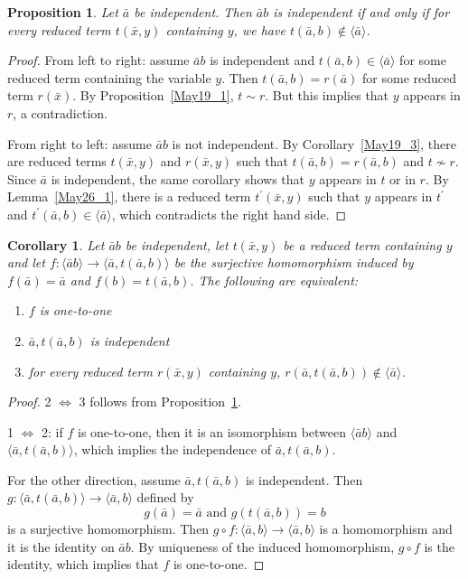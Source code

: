 \documentclass[a4paper, 11pt]{article}
\theoremstyle{note}
\newtheorem{prop}[thm]{Proposition}
\newtheorem{cor}[thm]{Corollary}
\begin{document}
	
	\begin{prop}\label{May26_2} Let $\bar{a}$  be independent. Then  $\bar{a}b$ is independent if and only if  for every reduced term $t(\bar{x},y)$ containing $y$, we have  $t(\bar{a},b)\not\in\langle \bar{a}\rangle$.
	\end{prop}
	\begin{proof} From left to right: assume $\bar{a}b$ is independent and  $t(\bar{a},b)\in\langle \bar{a}\rangle$  for some reduced term containing the variable $y$. Then $t(\bar{a},b)= r(\bar{a})$  for some reduced term $r(\bar{x})$. By Proposition~\ref{May19_1}, $t\sim r$. But this implies that $y$ appears in $r$, a contradiction.
		
		From right to left: assume $\bar{a}b$ is not independent. By Corollary~\ref{May19_3}, there are reduced terms $t(\bar{x},y)$ and $r(\bar{x},y)$ such that  $t(\bar{a},b)=r(\bar{a},b)$  and $t\not\sim r$. Since $\bar{a}$ is independent, the same corollary shows that $y$ appears in $t$ or in $r$. By Lemma~\ref{May26_1}, there is a reduced term $t^\prime(\bar{x},y)$ such that  $y$ appears in $t^\prime$ and   $t^\prime(\bar{a},b)\in\langle\bar{a}\rangle$, which contradicts the right hand side.
	\end{proof}
	
	\begin{cor}\label{May26_3} Let $\bar{a}b$  be independent, let $t(\bar{x},y)$ be a reduced term containing $y$ and let  $f:\langle\bar{a}b\rangle \rightarrow \langle\bar{a},t(\bar{a},b)\rangle$  be the surjective homomorphism induced by  $f(\bar{a})=\bar{a}$  and  $f(b)=t(\bar{a},b)$. The following are equivalent:
		\begin{enumerate}
			\item $f$ is one-to-one
			\item $\bar{a},t(\bar{a},b)$ is independent
			\item for every reduced term $r(\bar{x},y)$ containing $y$,  $r(\bar{a},t(\bar{a},b))\not\in\langle\bar{a}\rangle$.
		\end{enumerate}
	\end{cor}
	\begin{proof} 2 $\Leftrightarrow$ 3 follows from Proposition~\ref{May26_2}.
		
		1 $\Leftrightarrow$ 2:  if $f$ is one-to-one, then it is an isomorphism between $\langle\bar{a}b\rangle $  and $\langle\bar{a},t(\bar{a},b)\rangle$, which implies the independence of  $\bar{a},t(\bar{a},b)$. 
		
		For the other direction, assume  $\bar{a},t(\bar{a},b)$ is independent. Then  $g:\langle \bar{a},t(\bar{a},b)\rangle \rightarrow \langle \bar{a},b\rangle$  defined by  
		\[g(\bar{a})=\bar{a} \mbox{ and }g(t(\bar{a},b))= b \]
		 is a surjective homomorphism. Then  $g\circ f:\langle \bar{a},b\rangle \rightarrow \langle\bar{a},b\rangle$ is a homomorphism and it is the identity on $\bar{a}b$. By uniqueness of the induced homomorphism, $g\circ f$ is the identity, which implies that $f$ is one-to-one.
	\end{proof}
	
\end{document}
